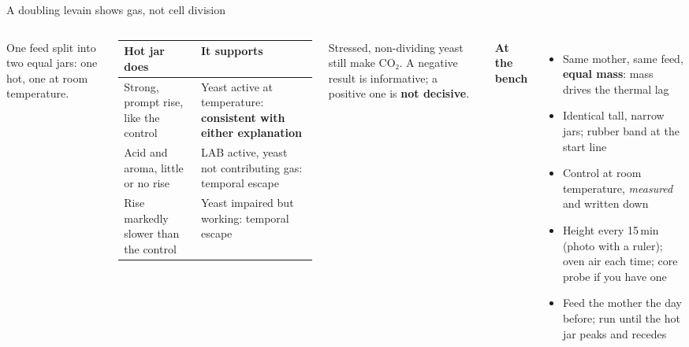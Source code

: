 \documentclass[aspectratio=169,11pt]{beamer}
\newcommand{\tablestart}[2]{\begingroup\renewcommand{\arraystretch}{#1}#2}
\newcommand{\tableend}{\endgroup\par}
\begin{document}
\begin{frame}{A doubling levain shows gas, not cell division \untested}
  \begin{columns}[T]
      {\footnotesize One feed split into two equal jars: one hot, one at room
      temperature.\par}
      \smallskip
      \tablestart{1.2}{\scriptsize}
      \begin{tabularx}{\linewidth}{@{}P{2.5cm}L@{}}
        \toprule
        \textbf{Hot jar does} & \textbf{It supports} \\
        \midrule
        Strong, prompt rise, like the control & Yeast active at temperature:
          \textbf{consistent with either explanation} \\
        Acid and aroma, little or no rise & LAB active, yeast not contributing gas:
          temporal escape \\
        Rise markedly slower than the control & Yeast impaired but working: temporal
          escape \\
        \bottomrule
      \end{tabularx}
      \tableend
      \smallskip
      {\footnotesize Stressed, non-dividing yeast still make CO₂. A negative result is
      informative; a positive one is \textbf{not decisive}.\par}
      {\color{crust}\textbf{At the bench}}
      \begin{itemize}\footnotesize
        \item Same mother, same feed, \textbf{equal mass}: mass drives the thermal lag
        \item Identical tall, narrow jars; rubber band at the start line
        \item Control at room temperature, \emph{measured} and written down
        \item Height every 15\,min (photo with a ruler); oven air each time; core probe if
          you have one
        \item Feed the mother the day before; run until the hot jar peaks and recedes
      \end{itemize}
  \end{columns}
\end{frame}
\end{document}
